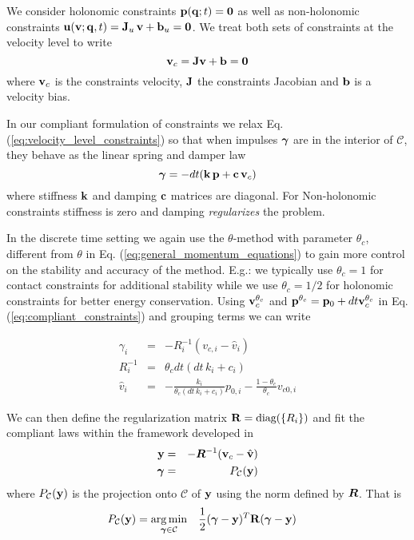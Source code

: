 We consider holonomic constraints ${\mathbf{p}}({\mathbf{q}};t)={\mathbf{0}}$ as well as
non-holonomic constraints ${\mathbf{u}}({\mathbf{v}}; {\mathbf{q}},t)={\mathbf{J}}_u\,{\mathbf{v}}+{\mathbf{b}}_u=
{\mathbf{0}}$. We treat both sets of constraints at the velocity level to write
\begin{equation}
	\mf{v}_c = \mf{J}\mf{v}+\mf{b}=\mf{0}
	\label{eq:velocity_level_constraints}
\end{equation}
where ${\mathbf{v}}_c$ is the constraints velocity, ${\mathbf{J}}$ the constraints Jacobian
and ${\mathbf{b}}$ is a velocity bias.

In our compliant formulation of constraints we relax Eq.
(\ref{eq:velocity_level_constraints}) so that when impulses ${\bm\gamma}$ are in the
interior of $\mathcal{C}$, they behave as the linear spring and damper law
\begin{equation}
	\bgamma = -dt(\mf{k}\,\mf{p} + \mf{c}\,\mf{v}_c)
	\label{eq:compliant_constraints}
\end{equation}
where stiffness ${\mathbf{k}}$ and damping ${\mathbf{c}}$ matrices are diagonal. For
Non-holonomic constraints stiffness is zero and damping \textit{regularizes} the
problem.

In the discrete time setting we again use the $\theta\text{-method}$ with
parameter $\theta_c$, different from $\theta$ in Eq.
(\ref{eq:general_momentum_equations}) to gain more control on the stability and
accuracy of the method. E.g.: we typically use $\theta_c=1$ for contact
constraints for additional stability while we use $\theta_c=1/2$ for holonomic
constraints for better energy conservation. Using ${\mathbf{v}}_c^{\theta_c}$ and
${\mathbf{p}}^{\theta_c}={\mathbf{p}}_0+dt{\mathbf{v}}_c^{\theta_c}$ in Eq.
(\ref{eq:compliant_constraints}) and grouping terms we can write

\begin{eqnarray}
	\gamma_i &=& -R_i^{-1}(v_{c,i}-\hat{v}_i)\nonumber\\
	R_i^{-1} &=& \theta_c dt (dt\,k_i+c_i)\nonumber\\
	\hat{v}_i &=& -\frac{k_i}{\theta_c(dt\,k_i+c_i)}p_{0,i}-
	              \frac{1-\theta_c}{\theta_c}v_{c0,i}
\end{eqnarray}

We can then define the regularization matrix ${\mathbf{R}}=\text{diag}(\{R_i\})$ and
fit the compliant laws within the framework developed in \cite{bib:todorov2014}
\begin{eqnarray}
	\mf{y} &=& -\vf{R}^{-1}(\mf{v}_c-\hat{\mf{v}}) \label{eq:y_definition}\\
	\bgamma &=& P_\mathcal{C}(\mf{y})
	\label{eq:projection_definition}
\end{eqnarray}
where $P_\mathcal{C}({\mathbf{y}})$ is the projection onto $\mathcal{C}$ of ${\mathbf{y}}$
using the norm defined by ${\bm{R}}$. That is
\begin{equation}
	\begin{aligned}
		P_\mathcal{C}({\mathbf{y}})=\operatorname*{arg\,min}_{{\bm\gamma}\in\mathcal{C}} \quad & \frac{1}{2}({\bm\gamma}-{\mathbf{y}})^T{\mathbf{R}}({\bm\gamma}-{\mathbf{y}})
	\end{aligned}
\end{equation}

